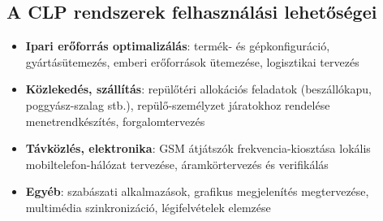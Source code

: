 
\subsection{A CLP rendszerek felhasználási lehetőségei}

\begin{itemize}
\item {\bf Ipari erőforrás optimalizálás}: termék- és gépkonfiguráció,
gyártásütemezés, emberi erőforrások ütemezése, logisztikai tervezés

\item {\bf Közlekedés, szállítás}: repülőtéri allokációs feladatok
(beszállókapu, poggyász-szalag stb.), repülő-személyzet járatokhoz rendelése
menetrendkészítés, forgalomtervezés

\item {\bf Távközlés, elektronika}: GSM átjátszók frekvencia-kiosztása
lokális mobiltelefon-hálózat tervezése, áramkörtervezés és verifikálás

\item {\bf Egyéb}: szabászati alkalmazások, grafikus megjelenítés megtervezése,
multimédia szinkronizáció, légifelvételek elemzése
\end{itemize}
